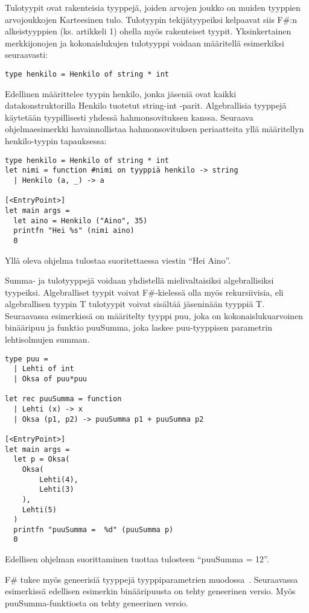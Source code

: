 Tulotyypit ovat rakenteisia tyyppejä, joiden arvojen joukko on muiden tyyppien arvojoukkojen Karteesinen tulo. Tulotyypin tekijätyypeiksi kelpaavat siis F\#:n alkeistyyppien (ks. artikkeli 1) ohella myös rakenteiset tyypit. Yksinkertainen merkkijonojen ja kokonaislukujen tulotyyppi voidaan määritellä esimerkiksi seuraavasti: 

\begin{lstlisting}
type henkilo = Henkilo of string * int
\end{lstlisting}

Edellinen määrittelee tyypin henkilo, jonka jäseniä ovat kaikki datakonstruktorilla Henkilo tuotetut string-int -parit. Algebrallisia tyyppejä käytetään tyypillisesti yhdessä hahmonsovituksen kanssa. Seuraava ohjelmaesimerkki havainnollistaa hahmonsovituksen periaatteita yllä määritellyn henkilo-tyypin tapauksessa:

\begin{lstlisting}
type henkilo = Henkilo of string * int
let nimi = function #nimi on tyyppiä henkilo -> string
  | Henkilo (a, _) -> a

[<EntryPoint>]
let main args =
  let aino = Henkilo ("Aino", 35)
  printfn "Hei %s" (nimi aino)
  0
\end{lstlisting}

Yllä oleva ohjelma tulostaa suoritettaessa viestin “Hei Aino”.

Summa- ja tulotyyppejä voidaan yhdistellä mielivaltaisiksi algebrallisiksi tyypeiksi. Algebralliset tyypit voivat F\#-kielessä olla myös rekursiivisia, eli algebrallisen tyypin T tulotyypit voivat sisältää jäseninään tyyppiä T. Seuraavassa esimerkissä on määritelty tyyppi puu, joka on kokonaislukuarvoinen binääripuu ja funktio puuSumma, joka laskee puu-tyyppisen parametrin lehtisolmujen summan.	

\begin{lstlisting}
type puu =
  | Lehti of int
  | Oksa of puu*puu

let rec puuSumma = function
  | Lehti (x) -> x
  | Oksa (p1, p2) -> puuSumma p1 + puuSumma p2

[<EntryPoint>]
let main args =
  let p = Oksa(
	Oksa(
  		Lehti(4),
  		Lehti(3)
	),
	Lehti(5)
  )
  printfn "puuSumma =  %d" (puuSumma p)
  0
\end{lstlisting}

Edellisen ohjelman suorittaminen tuottaa tulosteen “puuSumma =  12”. 
\par
F\# tukee myös geneerisiä tyyppejä tyyppiparametrien muodossa~\cite{msn_generics}. Seuraavassa esimerkissä edellisen esimerkin binääripuusta on tehty geneerinen versio. Myös puuSumma-funktiosta on tehty geneerinen versio.

